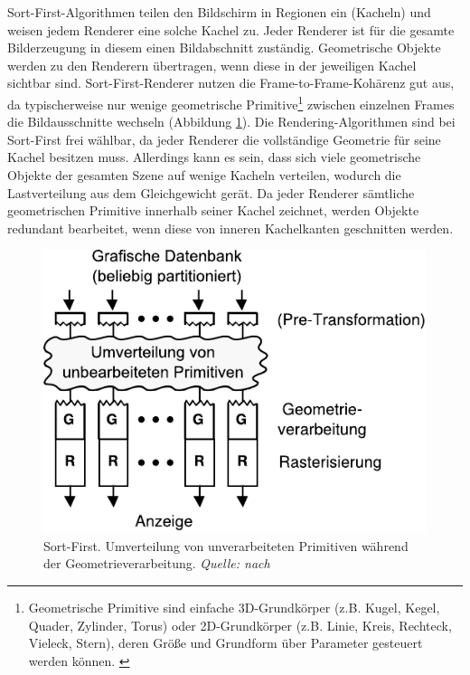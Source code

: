 Sort-First-Algorithmen teilen den Bildschirm in Regionen ein (Kacheln) und weisen jedem Renderer eine solche Kachel zu. Jeder Renderer ist für die gesamte Bilderzeugung in diesem einen Bildabschnitt zuständig. Geometrische Objekte werden zu den Renderern übertragen, wenn diese in der jeweiligen Kachel sichtbar sind. Sort-First-Renderer nutzen die Frame-to-Frame-Kohärenz gut aus, da typischerweise nur wenige geometrische Primitive\footnote{Geometrische Primitive sind einfache 3D-Grundkörper (z.B. Kugel, Kegel, Quader, Zylinder, Torus) oder 2D-Grundkörper (z.B. Linie, Kreis, Rechteck, Vieleck, Stern), deren Größe und Grundform über Parameter gesteuert werden können. \cite{medieninfo}} zwischen einzelnen Frames die Bildausschnitte wechseln (Abbildung \ref{fig:relwork:sortfirst}). Die Rendering-Algorithmen sind bei Sort-First frei wählbar, da jeder Renderer die vollständige Geometrie für seine Kachel besitzen muss. Allerdings kann es sein, dass sich viele geometrische Objekte der gesamten Szene auf wenige Kacheln verteilen, wodurch die Lastverteilung aus dem Gleichgewicht gerät. Da jeder Renderer sämtliche geometrischen Primitive innerhalb seiner Kachel zeichnet, werden Objekte redundant bearbeitet, wenn diese von inneren Kachelkanten geschnitten werden.
\begin{figure}
 \centering
  \includegraphics[scale=0.8]{images/sort-first.pdf}
  \caption{Sort-First. Umverteilung von unverarbeiteten Primitiven während der Geometrieverarbeitung. \textit{Quelle: nach \cite{molnar}}}
 \label{fig:relwork:sortfirst}
\end{figure}

